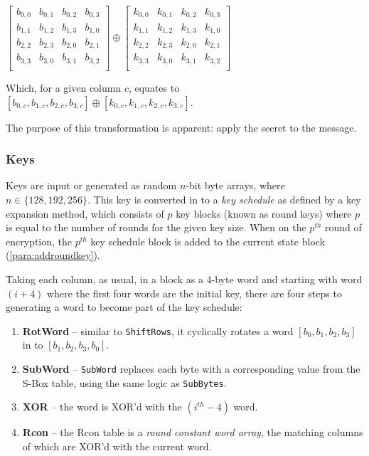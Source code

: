     \begin{center}
      $\begin{bmatrix}
        b_{0,0} & b_{0,1} & b_{0,2} & b_{0,3} \\
        b_{1,1} & b_{1,2} & b_{1,3} & b_{1,0} \\
        b_{2,2} & b_{2,3} & b_{2,0} & b_{2,1} \\
        b_{3,3} & b_{3,0} & b_{3,1} & b_{3,2} \\
      \end{bmatrix} \oplus
      \begin{bmatrix}
        k_{0,0} & k_{0,1} & k_{0,2} & k_{0,3} \\
        k_{1,1} & k_{1,2} & k_{1,3} & k_{1,0} \\
        k_{2,2} & k_{2,3} & k_{2,0} & k_{2,1} \\
        k_{3,3} & k_{3,0} & k_{3,1} & k_{3,2} \\
      \end{bmatrix}$
    \end{center}
    
    Which, for a given column $c$, equates to $[b_{0,c},b_{1,c},b_{2,c},b_{3,c}] \oplus [k_{0,c},k_{1,c},k_{2,c},k_{3,c}]$.
    
    The purpose of this transformation is apparent: apply the secret to the message.
    
    \subsubsection{Keys}
    \label{subsubsec:aes_keys}
    
    Keys are input or generated as random $n$-bit byte arrays, where $n \in \{128,192,256\}$. This key is converted in to a \emph{key schedule} as defined by a key expansion method, which consists of $p$ key blocks (known as round keys) where $p$ is equal to the number of rounds for the given key size. When on the $p^{th}$ round of encryption, the $p^{th}$ key schedule block is added to the current state block (\textsection\ref{para:addroundkey}).
    
    Taking each column, as usual, in a block as a 4-byte word and starting with word $(i+4)$ where the first four words are the initial key, there are four steps to generating a word to become part of the key schedule:
    
    \begin{enumerate}
      \item \textbf{RotWord} -- similar to \verb!ShiftRows!, it cyclically rotates a word $[b_0,b_1,b_2,b_3]$ in to $[b_1,b_2,b_3,b_0]$.
      \item \textbf{SubWord} -- \verb!SubWord! replaces each byte with a corresponding value from the S-Box table, using the same logic as  \verb!SubBytes!.
      \item \textbf{XOR} -- the word is XOR'd with the $(i^{th}-4)$ word.
      \item \textbf{Rcon} -- the Rcon table is a \emph{round constant word array}, the matching columns of which are XOR'd with the current word.
    \end{enumerate}
    
